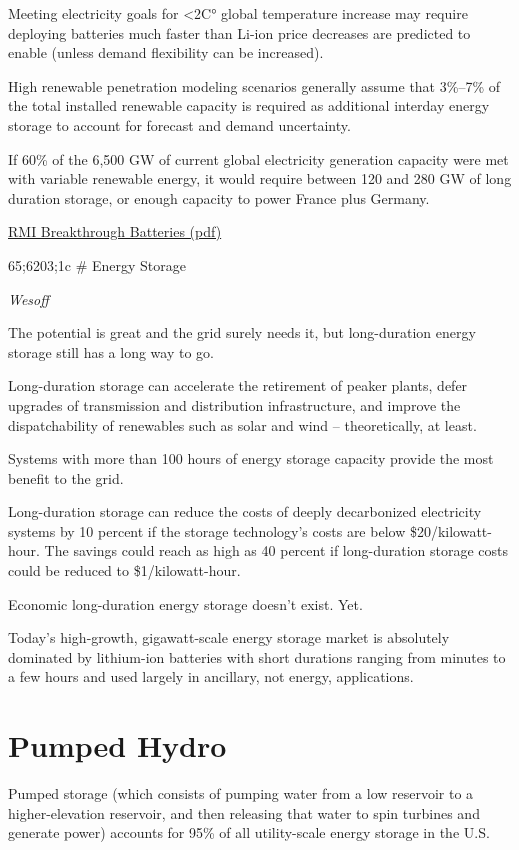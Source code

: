 \documentclass[
]{book}
\begin{document}
Meeting electricity goals for \textless2C° global temperature increase
may require deploying batteries much faster than Li-ion price decreases
are predicted to enable (unless demand flexibility can be increased).

High renewable penetration modeling scenarios generally assume that
3\%--7\% of the total installed renewable capacity is required as additional
interday energy storage to account for forecast and demand uncertainty.

If 60\% of the 6,500 GW of current global electricity generation capacity
were met with variable renewable energy, it would require between 120
and 280 GW of long duration storage, or enough capacity to power France
plus Germany.

\href{pdf/rmi_breakthrough_batteries.pdf}{RMI Breakthrough Batteries (pdf)}

65;6203;1c
\# Energy Storage

\emph{Wesoff}

The potential is great and the grid surely needs it, but long-duration energy storage still has a long way to go.

Long-duration storage can accelerate the retirement of peaker plants, defer upgrades of transmission and distribution infrastructure, and improve the dispatchability of renewables such as solar and wind -- theoretically, at least.

Systems with more than 100 hours of energy storage capacity provide the most benefit to the grid.

Long-duration storage can reduce the costs of deeply decarbonized electricity systems by 10 percent if the storage technology's costs are below \$20/kilowatt-hour. The savings could reach as high as 40 percent if long-duration storage costs could be reduced to \$1/kilowatt-hour.

Economic long-duration energy storage doesn't exist. Yet.

Today's high-growth, gigawatt-scale energy storage market is absolutely dominated by lithium-ion batteries with short durations ranging from minutes to a few hours and used largely in ancillary, not energy, applications.

\hypertarget{pumped-hydro}{%
\section{Pumped Hydro}\label{pumped-hydro}}

Pumped storage (which consists of pumping water from a low reservoir to a higher-elevation reservoir, and then releasing that water to spin turbines and generate power) accounts for 95\% of all utility-scale energy storage in the U.S.
\end{document}
